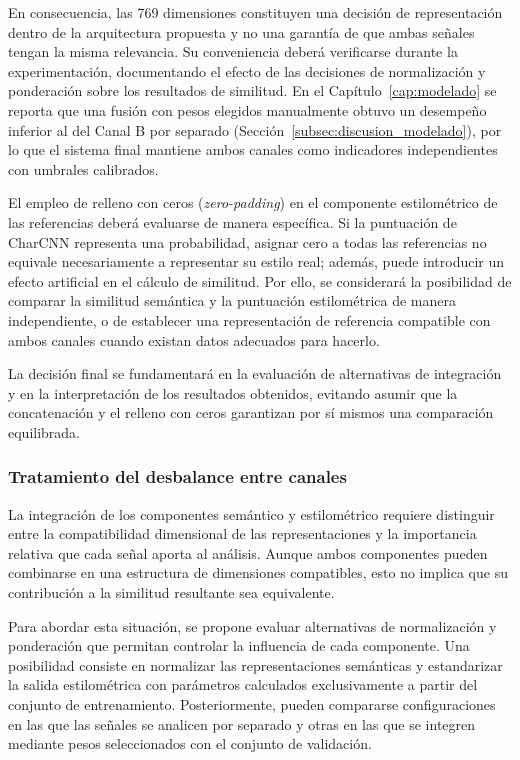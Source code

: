 En consecuencia, las 769 dimensiones constituyen una decisión de representación dentro de la arquitectura propuesta y no una garantía de que ambas señales tengan la misma relevancia. Su conveniencia deberá verificarse durante la experimentación, documentando el efecto de las decisiones de normalización y ponderación sobre los resultados de similitud. En el Capítulo~\ref{cap:modelado} se reporta que una fusión con pesos elegidos manualmente obtuvo un desempeño inferior al del Canal B por separado (Sección~\ref{subsec:discusion_modelado}), por lo que el sistema final mantiene ambos canales como indicadores independientes con umbrales calibrados.

El empleo de relleno con ceros (\textit{zero-padding}) en el componente estilométrico de las referencias deberá evaluarse de manera específica. Si la puntuación de CharCNN representa una probabilidad, asignar cero a todas las referencias no equivale necesariamente a representar su estilo real; además, puede introducir un efecto artificial en el cálculo de similitud. Por ello, se considerará la posibilidad de comparar la similitud semántica y la puntuación estilométrica de manera independiente, o de establecer una representación de referencia compatible con ambos canales cuando existan datos adecuados para hacerlo.

La decisión final se fundamentará en la evaluación de alternativas de integración y en la interpretación de los resultados obtenidos, evitando asumir que la concatenación y el relleno con ceros garantizan por sí mismos una comparación equilibrada.

\subsubsection{Tratamiento del desbalance entre canales}

La integración de los componentes semántico y estilométrico requiere distinguir entre la compatibilidad dimensional de las representaciones y la importancia relativa que cada señal aporta al análisis. Aunque ambos componentes pueden combinarse en una estructura de dimensiones compatibles, esto no implica que su contribución a la similitud resultante sea equivalente.

Para abordar esta situación, se propone evaluar alternativas de normalización y ponderación que permitan controlar la influencia de cada componente. Una posibilidad consiste en normalizar las representaciones semánticas y estandarizar la salida estilométrica con parámetros calculados exclusivamente a partir del conjunto de entrenamiento. Posteriormente, pueden compararse configuraciones en las que las señales se analicen por separado y otras en las que se integren mediante pesos seleccionados con el conjunto de validación.

